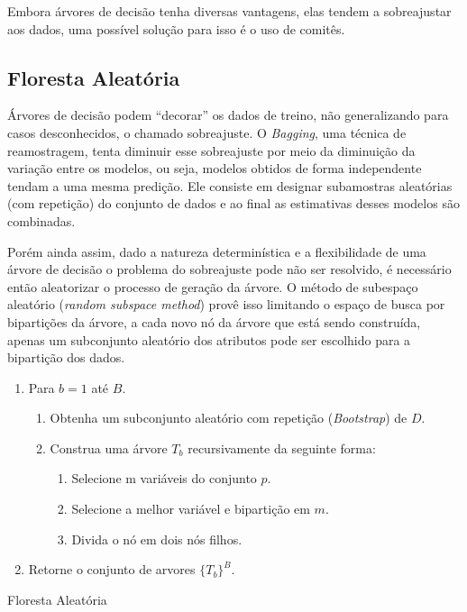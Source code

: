 Embora árvores de decisão tenha diversas vantagens, elas tendem a sobreajustar
aos dados, uma possível solução para isso é o uso de comitês.

\subsection{Floresta Aleatória}

Árvores de decisão podem ``decorar'' os dados de treino, não generalizando para
casos desconhecidos, o chamado sobreajuste. O \textit{Bagging}, uma técnica de
reamostragem, tenta diminuir esse sobreajuste por meio da diminuição da
variação entre os modelos, ou seja, modelos obtidos de forma independente
tendam a uma mesma predição. Ele consiste em designar subamostras aleatórias
(com repetição) do conjunto de dados e ao final as estimativas desses modelos
são combinadas.

Porém ainda assim, dado a natureza determinística e a flexibilidade de uma
árvore de decisão o problema do sobreajuste pode não ser resolvido, é
necessário então aleatorizar o processo de geração da árvore. O método de
subespaço aleatório (\textit{random subspace method}) provê isso limitando o
espaço de busca por bipartições da árvore, a cada novo nó da árvore que está
sendo construída, apenas um subconjunto aleatório dos atributos pode ser
escolhido para a bipartição dos dados.

\begin{algorithm}[ht]
\begin{enumerate}
    \item Para $b=1$ até $B$.
    \begin{enumerate}
        \item Obtenha um subconjunto aleatório com repetição
            (\textit{Bootstrap}) de $D$.
        \item Construa uma árvore $T_b$ recursivamente da seguinte forma:
        \begin{enumerate}
            \item Selecione m variáveis do conjunto $p$.
            \item Selecione a melhor variável e bipartição em $m$.
            \item Divida o nó em dois nós filhos.
        \end{enumerate}
    \end{enumerate}
    \item Retorne o conjunto de arvores $\{T_b\}^B$.
\end{enumerate}
 \caption{Floresta Aleatória}
 \label{algo:rf}
\end{algorithm}

